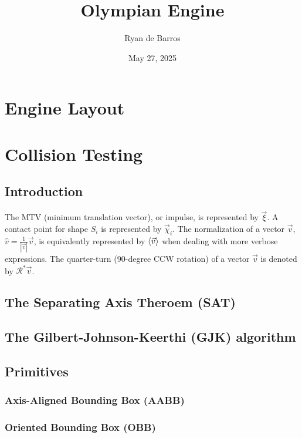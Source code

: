 \documentclass[10pt]{report}
\newcommand{\quarterturn}{\mathcal{R^*}}
\begin{document}
\title{Olympian Engine}
\author{Ryan de Barros}
\date{May 27, 2025}
\maketitle

\tableofcontents

\chapter{Engine Layout}

\chapter{Collision Testing}

\section{Introduction}
The MTV (minimum translation vector), or impulse, is represented by $\vec{\xi}$. A contact point for shape $S_i$ is represented by $\vec{\chi}_i$. The normalization of a vector $\vec{v}$, $\hat{v}=\frac{1}{|\vec{v}|}\vec{v}$, is equivalently represented by $\braket{\vec{v}}$ when dealing with more verbose expressions. The quarter-turn (90-degree CCW rotation) of a vector $\vec{v}$ is denoted by $\quarterturn\vec{v}$.

\section{The Separating Axis Theroem (SAT)}

\section{The Gilbert-Johnson-Keerthi (GJK) algorithm}

\section{Primitives}

\subsection{Axis-Aligned Bounding Box (AABB)}

\subsection{Oriented Bounding Box (OBB)}
\end{document}
